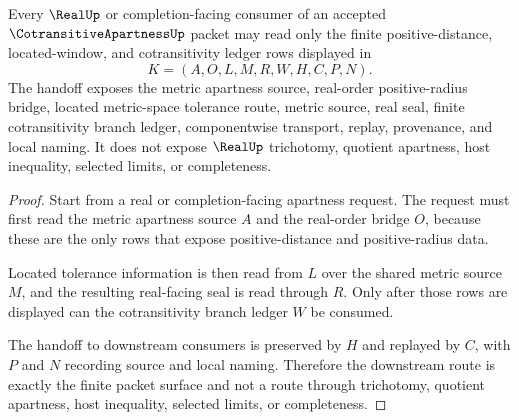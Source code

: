 \begin{theorem}
\label{thm:cotransitive-apartness-real-route}
Every $\RealUp$ or completion-facing consumer of an accepted $\CotransitiveApartnessUp$ packet may read only the finite positive-distance, located-window, and cotransitivity ledger rows displayed in
$$
K=(A,O,L,M,R,W,H,C,P,N).
$$
The handoff exposes the metric apartness source, real-order positive-radius bridge, located metric-space tolerance route, metric source, real seal, finite cotransitivity branch ledger, componentwise transport, replay, provenance, and local naming. It does not expose $\RealUp$ trichotomy, quotient apartness, host inequality, selected limits, or completeness.
\end{theorem}
\begin{proof}
Start from a real or completion-facing apartness request. The request must first read the metric apartness source $A$ and the real-order bridge $O$, because these are the only rows that expose positive-distance and positive-radius data.

Located tolerance information is then read from $L$ over the shared metric source $M$, and the resulting real-facing seal is read through $R$. Only after those rows are displayed can the cotransitivity branch ledger $W$ be consumed.

The handoff to downstream consumers is preserved by $H$ and replayed by $C$, with $P$ and $N$ recording source and local naming. Therefore the downstream route is exactly the finite packet surface and not a route through trichotomy, quotient apartness, host inequality, selected limits, or completeness.
\end{proof}



